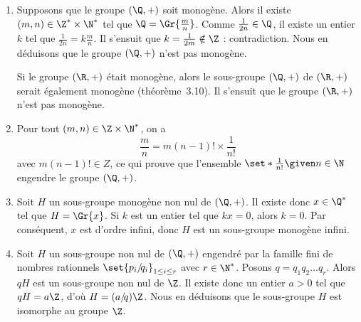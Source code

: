 \begin{enumerate}
  \item 
    Supposons que le groupe $(\Q,+)$ soit monogène.
    Alors il existe $(m,n)\in\Z^*\times\N^*$ tel que $\Q = \Gr{\frac{m}{n}}$.
    Comme $\frac{1}{2n}\in\Q$, il existe un entier $k$ tel que $\frac{1}{2n} = k\frac{m}{n}$.
    Il s'ensuit que $k = \frac{1}{2m}\notin\Z$ : contradiction.
    Nous en déduisons que le groupe $(\Q,+)$ n'est pas monogène.

    Si le groupe $(\R,+)$ était monogène, alors le sous-groupe $(\Q,+)$ de $(\R,+)$ serait également monogène (théorème~3.10).
    Il s'ensuit que le groupe $(\R,+)$ n'est pas monogène.
  \item
    Pour tout $(m,n)\in\Z\times\N^*$, on a 
    \[
      \frac{m}{n} = m(n - 1)!\times\frac{1}{n!}
    \]
    avec $m(n - 1)!\in Z$, ce qui prouve que l'ensemble $\set*{\frac{1}{n!}\given n\in\N}$ engendre le groupe $(\Q,+)$.
  \item
    Soit $H$ un sous-groupe monogène non nul de $(\Q,+)$.
    Il existe donc $x\in\Q^*$ tel que $H = \Gr{x}$.
    Si $k$ est un entier tel que $kx = 0$, alors $k = 0$.
    Par conséquent, $x$ est d'ordre infini, donc $H$ est un sous-groupe monogène infini.
  \item
    Soit $H$ un sous-groupe non nul de $(\Q,+)$ engendré par la famille fini de nombres rationnels $\set{p_i/\!q_i}_{1\leq i\leq r}$ avec $r\in\N^*$. 
    Posons $q = q_1q_2\dots q_r$.
    Alors $qH$ est un sous-groupe non nul de $\Z$.
    Il existe donc un entier $a > 0$ tel que $qH = a\Z$, d'où $H = (a/\!q)\Z$.
    Nous en déduisons que le sous-groupe $H$ est isomorphe au groupe $\Z$.
\end{enumerate}

